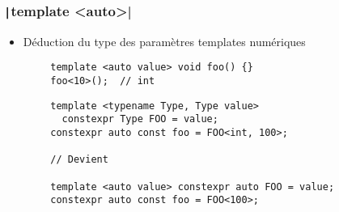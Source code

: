 \documentclass[C++.tex]{subfiles}
\begin{document}
\begin{frame}[fragile]
	\frametitle{\texttt|template <auto>|}
	\begin{itemize}
		\item Déduction du type des paramètres templates numériques
	\end{itemize}

	\begin{verbatim}
		template <auto value> void foo() {}
		foo<10>();  // int
	\end{verbatim}

	\begin{verbatim}
		template <typename Type, Type value>
		  constexpr Type FOO = value;
		constexpr auto const foo = FOO<int, 100>;

		// Devient

		template <auto value> constexpr auto FOO = value;
		constexpr auto const foo = FOO<100>;
	\end{verbatim}


\end{frame}
\end{document}
